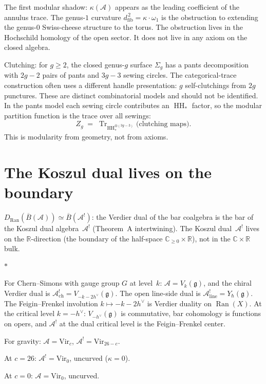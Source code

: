 \documentclass[11pt]{article}
\newcommand{\cA}{\mathcal{A}}
\newcommand{\fg}{\mathfrak{g}}
\newcommand{\barB}{\overline{B}}
\newcommand{\C}{\mathbb{C}}
\newcommand{\R}{\mathbb{R}}
\newcommand{\Ran}{\operatorname{Ran}}
\newcommand{\HH}{\operatorname{HH}}
\newcommand{\Tr}{\operatorname{Tr}}
\newcommand{\dfib}{d_{\mathrm{fib}}}
\newcommand{\sep}{\bigskip\begin{center}$*$\end{center}\medskip}
\begin{document}
The first modular shadow: $\kappa(\cA)$ appears as the leading
coefficient of the annulus trace.  The genus-$1$ curvature
$\dfib^{\,2} = \kappa \cdot \omega_1$ is the obstruction to
extending the genus-$0$ Swiss-cheese structure to the torus.  The
obstruction lives in the Hochschild homology of the open sector.
It does not live in any axiom on the closed algebra.

Clutching: for $g\ge2$, the closed genus-$g$ surface $\Sigma_g$
has a pants decomposition with $2g-2$ pairs of pants and
$3g-3$ sewing circles.  The categorical-trace construction often
uses a different handle presentation: $g$ self-clutchings from
$2g$ punctures.  These are distinct combinatorial models and
should not be identified.  In the pants model each sewing circle
contributes an $\HH_*$ factor, so the modular partition function is
the trace over all sewings:
\[
Z_g
\;=\;
\Tr_{\HH_*^{\otimes(3g-3)}}
\bigl(\text{clutching maps}\bigr).
\]
This is modularity from geometry, not from axioms.


\section{The Koszul dual lives on the boundary}
\label{sec:koszul-dual-boundary}

$D_{\Ran}(\barB(\cA)) \simeq \barB(\cA^!)$: the Verdier dual of the bar
coalgebra is the bar of the Koszul dual algebra~$\cA^!$
(Theorem~A intertwining).  The Koszul dual~$\cA^!$ lives on
the $\R$-direction (the boundary of the half-space
$\C_{\geq 0} \times \R$), not in the $\C \times \R$ bulk.

\sep

For Chern--Simons with gauge group $G$ at level~$k$:
$\cA = V_k(\fg)$, and the chiral Verdier dual is
$\cA^!_{\mathrm{ch}} = V_{-k-2h^\vee}(\fg)$.  The open line-side
dual is $\cA^!_{\mathrm{line}}=Y_\hbar(\fg)$.  The
Feigin--Frenkel involution $k \mapsto -k - 2h^\vee$ is Verdier
duality on $\Ran(X)$.  At the critical level $k = -h^\vee$:
$V_{-h^\vee}(\fg)$ is commutative, bar cohomology is functions on
opers, and $\cA^!$ at the dual critical level is the
Feigin--Frenkel center.

For gravity: $\cA = \mathrm{Vir}_c$,
$\cA^! = \mathrm{Vir}_{26-c}$.

At $c = 26$: $\cA^! = \mathrm{Vir}_0$, uncurved
($\kappa = 0$).

At $c = 0$: $\cA = \mathrm{Vir}_0$, uncurved.
\end{document}
